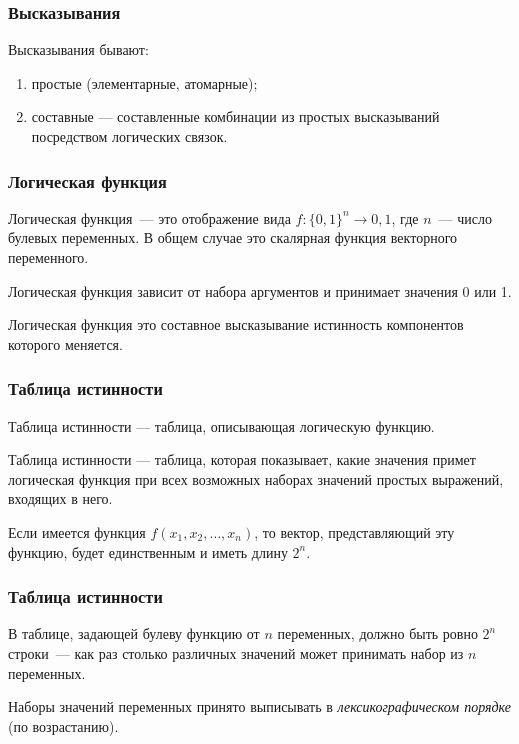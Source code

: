 \begin{frame}
\frametitle{Высказывания}

Высказывания бывают:
\begin{enumerate}
	\item простые (элементарные, атомарные);
	\item составные --- составленные комбинации из простых высказываний посредством логических связок. 
\end{enumerate}
\end{frame}


\begin{frame}
\frametitle{Логическая функция}

Логическая функция~--- это отображение вида $f: \{0, 1\}^n \rightarrow {0, 1}$, где $n$~---
число булевых переменных. В общем случае это скалярная функция векторного переменного.\pause

Логическая функция зависит от набора аргументов и принимает значения 0 или 1.\pause

Логическая функция это составное высказывание истинность компонентов которого меняется.

\end{frame}

\begin{frame}
\frametitle{Таблица истинности}

Таблица истинности --- таблица, описывающая логическую функцию. \pause

Таблица истинности --- таблица, которая показывает, какие значения примет логическая функция при всех возможных наборах значений простых выражений, входящих в него.\pause

Если имеется функция $f(x_1, x_2, \ldots, x_n)$, то вектор, представляющий эту функцию, будет единственным и иметь длину $2^n$.

\end{frame}

\begin{frame}
\frametitle{Таблица истинности}

В таблице, задающей булеву функцию от $n$ переменных, должно быть ровно $2^n$ строки~--- как раз
столько различных значений может принимать набор из $n$ переменных. \pause

Наборы значений переменных 
принято выписывать в \textit{лексикографическом порядке} (по возрастанию).

\end{frame}

